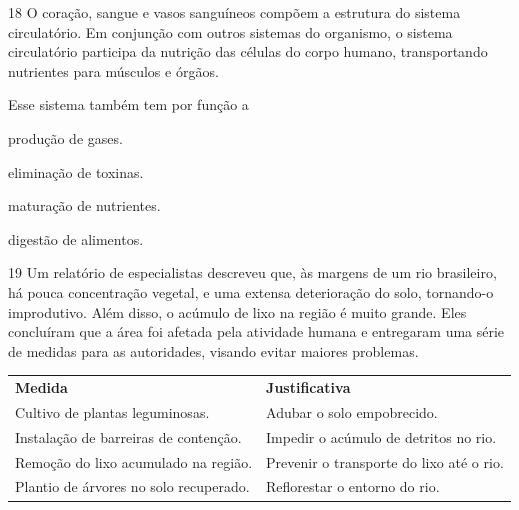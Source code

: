 

\num{18} O coração, sangue e vasos sanguíneos compõem a estrutura do
sistema circulatório. Em conjunção com outros sistemas do organismo, o
sistema circulatório participa da nutrição das células do corpo humano,
transportando nutrientes para músculos e órgãos.

Esse sistema também tem por função a

\begin{minipage}{.5\textwidth}
\begin{escolha}
\item produção de gases.

\item eliminação de toxinas.

\item maturação de nutrientes.

\item digestão de alimentos.
\end{escolha}
\end{minipage}

\pagebreak
\num{19} Um relatório de especialistas descreveu que, às margens de
um rio brasileiro, há pouca concentração vegetal, e uma extensa
deterioração do solo, tornando-o improdutivo. Além disso, o acúmulo de
lixo na região é muito grande. Eles concluíram que a área foi afetada
pela atividade humana e entregaram uma série de medidas para as
autoridades, visando evitar maiores problemas.

\begin{longtable}[]{@{}ll@{}}
\toprule
\textbf{Medida} & \textbf{Justificativa}\tabularnewline
Cultivo de plantas leguminosas. & Adubar o solo
empobrecido.\tabularnewline
Instalação de barreiras de contenção. & Impedir o acúmulo de detritos no
rio.\tabularnewline
Remoção do lixo acumulado na região. & Prevenir o transporte do lixo até
o rio.\tabularnewline
Plantio de árvores no solo recuperado. & Reflorestar o entorno do
rio.\tabularnewline
\bottomrule
\end{longtable}

